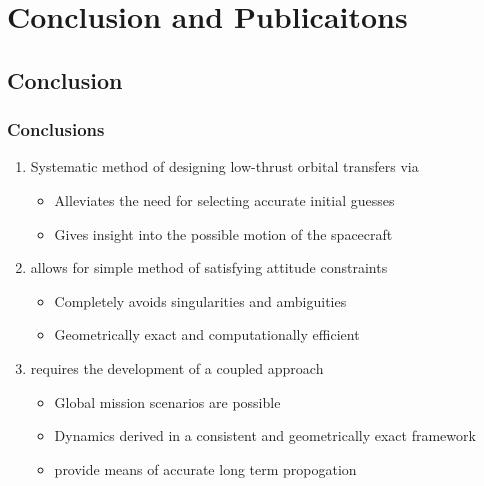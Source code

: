 

\section[Conclusion]{Conclusion and Publicaitons}
\subsection*{Conclusion}

\begin{frame} %
\frametitle{Conclusions}
  \begin{enumerate}[<+->]
    \item Systematic method of designing low-thrust orbital transfers via 
    \begin{itemize}
        \item Alleviates the need for selecting accurate initial guesses 
        \item Gives insight into the possible motion of the spacecraft
    \end{itemize}
    \item {} allows for simple method of satisfying attitude constraints
    \begin{itemize}
        \item Completely avoids singularities and ambiguities
        \item Geometrically exact and computationally efficient
    \end{itemize}
    \item {} requires the development of a coupled approach 
    \begin{itemize}
        \item Global mission scenarios are possible
        \item Dynamics derived in a consistent and geometrically exact framework
        \item {} provide means of accurate long term propogation
    \end{itemize}

  \end{enumerate}
  
\end{frame}   %


